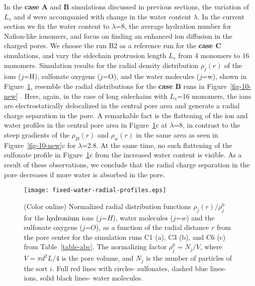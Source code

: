 \documentclass[3p,english,preprint]{elsarticle}
\newcommand{\need}[1]{\textcolor{black}{#1}}
\newcommand{\mage}[1]{\textcolor{black}{#1}}
\begin{document}
In the {\bf case A} and 
{\bf B} simulations discussed in previous sections,  
the variation of $L_s$ and $d$ were accompanied with change 
in the water content $\lambda$. In the current section 
we  fix the water content to  $\lambda$=8, the average 
hydration number for Nafion-like ionomers, 
and focus on finding an enhanced  ion diffusion in the charged pores. 
We choose the run B2 as a reference run for the {\bf case C} simulations, 
and vary the sidechain protrusion length $L_s$ from 4 monomers to 16 monomers.
Simulation results for the radial density distribution 
$\rho_j(r)$ of the ions ($j$=H), 
             sulfonate oxygens ($j$=O), and the 
        water molecules ($j$=w),  
shown in Figure~\ref{fig-13-new}, resemble the radial 
distributions for the {\bf case B} runs in Figure~\ref{fig-10-new} \cite{explain}. 
Here, again, in the case of long sidechains with $L_s$=16 monomers, 
  the ions are electrostatically  delocalized in the central pore  
area and generate a radial charge separation in the pore.  
A remarkable fact is the flattening of the ion 
 and water profiles in the central pore area in  Figure~\ref{fig-13-new}c at 
$\lambda$=8, in contrast to the steep gradients  of the $\rho_H(r)$
and $\rho_w(r)$ in the same area as seen in  Figure~\ref{fig-10-new}c for $\lambda$=2.8. 
At the same time,  no such flattening  of the  
sulfonate profile in Figure~\ref{fig-13-new}c from the increased 
water content is visible. 
As a result of these  observations, we conclude that 
the radial charge separation in the pore decreases if 
more water is absorbed in the pore.  



\begin{figure}[!ht]
\begin{center}
\texttt{[image: fixed-water-radial-profiles.eps]}
\end{center}
\vspace{-0.7cm}
\caption{(Color online) 
Normalized radial distribution
  functions $\rho_j(r)/\rho_j^0$ for the 
{\need{ 
 hydronium 
}}
ions ($j$=$H$), water molecules ($j$=$w$) and 
  the sulfonate oxygens ($j$=$O$), 
as a function of the radial distance $r$ from  the pore center
 for the simulation runs C1 (a), C3 (b), and C6 (c) from
   Table~\ref{table-abc}.   The normalizing
  factor $\rho_j^0=N_j/V$, where $V=\pi d^2 L/4$ is the pore volume,
  and $N_j$ is the  number of particles of the sort $i$. 
Full red lines with circles- sulfonates, dashed blue lines- ions, 
solid black lines- water molecules.
 \label{fig-13-new}}
\end{figure}
\end{document}
